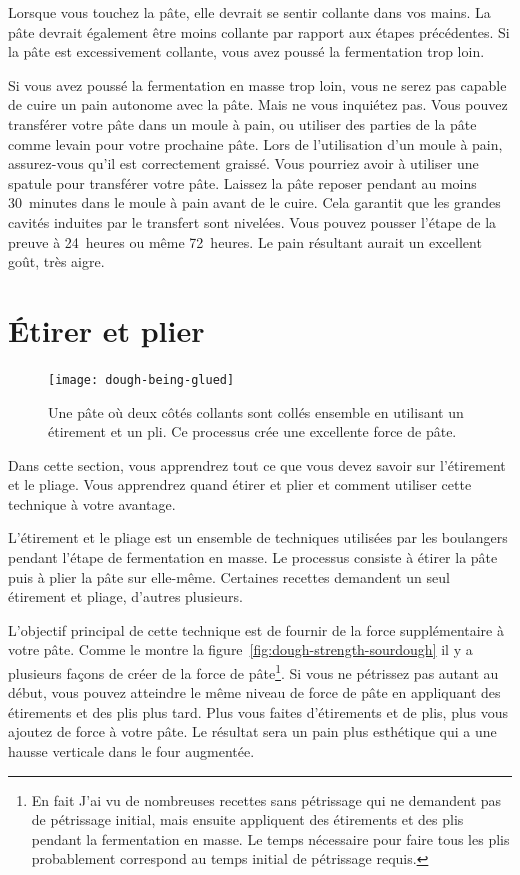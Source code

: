 Lorsque vous touchez la pâte, elle devrait se sentir collante
dans vos mains. La pâte devrait également être moins collante
par rapport aux étapes précédentes. Si la pâte est excessivement
collante, vous avez poussé la fermentation trop loin.

Si vous avez poussé la fermentation en masse trop loin, vous ne serez pas capable
de cuire un pain autonome avec la pâte. Mais ne vous
inquiétez pas. Vous pouvez transférer votre pâte dans un moule à pain, ou utiliser des parties
de la pâte comme levain pour votre prochaine pâte. Lors de l'utilisation
d'un moule à pain, assurez-vous qu'il est correctement graissé. Vous pourriez avoir
à utiliser une spatule pour transférer votre pâte. Laissez la pâte
reposer pendant au moins 30~minutes dans le moule à pain avant
de le cuire. Cela garantit que les grandes cavités induites
par le transfert sont nivelées. Vous pouvez pousser l'étape de la preuve
à 24~heures ou même 72~heures. Le pain résultant
aurait un excellent goût, très aigre.


\section{Étirer et plier}

\begin{figure}[!htb]
  \texttt{[image: dough-being-glued]}
  \caption[Collage de la pâte]{Une pâte où deux côtés collants sont collés
      ensemble en utilisant un étirement et un pli. Ce processus crée une excellente force de pâte.}
\end{figure}

Dans cette section, vous apprendrez tout ce que vous devez savoir sur l'étirement et
le pliage. Vous apprendrez quand étirer et plier et comment utiliser cette technique
à votre avantage.

L'étirement et le pliage est un ensemble de techniques utilisées par les boulangers pendant l'étape de fermentation en masse. Le processus consiste à étirer la pâte puis
à plier la pâte sur elle-même. Certaines recettes demandent un seul étirement
et pliage, d'autres plusieurs.

L'objectif principal de cette technique est de fournir
de la force supplémentaire à votre pâte. Comme le montre la figure~\ref{fig:dough-strength-sourdough}
il y a plusieurs façons de créer de la force de pâte\footnote{En fait J'ai vu de nombreuses recettes sans pétrissage
qui ne demandent pas de pétrissage initial, mais ensuite appliquent des étirements et des plis
pendant la fermentation en masse. Le temps nécessaire pour faire tous les plis probablement
correspond au temps initial de pétrissage requis.}. Si vous ne pétrissez pas autant au
début, vous pouvez atteindre le même niveau de force de pâte en appliquant des étirements et des plis plus tard. Plus vous faites d'étirements et de plis, plus vous ajoutez de force à votre pâte. Le résultat sera un pain plus esthétique qui a
une hausse verticale dans le four augmentée.

